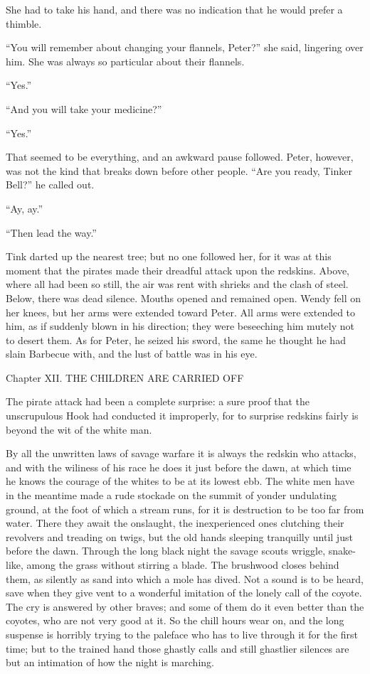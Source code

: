 She had to take his hand, and there was no indication that he would
prefer a thimble.

``You will remember about changing your flannels, Peter?'' she said,
lingering over him. She was always so particular about their flannels.

``Yes.''

``And you will take your medicine?''

``Yes.''

That seemed to be everything, and an awkward pause followed. Peter,
however, was not the kind that breaks down before other people. ``Are
you ready, Tinker Bell?'' he called out.

``Ay, ay.''

``Then lead the way.''

Tink darted up the nearest tree; but no one followed her, for it was at
this moment that the pirates made their dreadful attack upon the
redskins. Above, where all had been so still, the air was rent with
shrieks and the clash of steel. Below, there was dead silence. Mouths
opened and remained open. Wendy fell on her knees, but her arms were
extended toward Peter. All arms were extended to him, as if suddenly
blown in his direction; they were beseeching him mutely not to desert
them. As for Peter, he seized his sword, the same he thought he had
slain Barbecue with, and the lust of battle was in his eye.




Chapter XII.
THE CHILDREN ARE CARRIED OFF


The pirate attack had been a complete surprise: a sure proof that the
unscrupulous Hook had conducted it improperly, for to surprise redskins
fairly is beyond the wit of the white man.

By all the unwritten laws of savage warfare it is always the redskin
who attacks, and with the wiliness of his race he does it just before
the dawn, at which time he knows the courage of the whites to be at its
lowest ebb. The white men have in the meantime made a rude stockade on
the summit of yonder undulating ground, at the foot of which a stream
runs, for it is destruction to be too far from water. There they await
the onslaught, the inexperienced ones clutching their revolvers and
treading on twigs, but the old hands sleeping tranquilly until just
before the dawn. Through the long black night the savage scouts
wriggle, snake-like, among the grass without stirring a blade. The
brushwood closes behind them, as silently as sand into which a mole has
dived. Not a sound is to be heard, save when they give vent to a
wonderful imitation of the lonely call of the coyote. The cry is
answered by other braves; and some of them do it even better than the
coyotes, who are not very good at it. So the chill hours wear on, and
the long suspense is horribly trying to the paleface who has to live
through it for the first time; but to the trained hand those ghastly
calls and still ghastlier silences are but an intimation of how the
night is marching.

